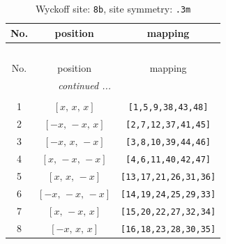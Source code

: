 \documentclass[fleqn,8pt]{jsarticle}
\begin{document}
\renewcommand{\arraystretch}{1.2}
\begin{longtable}{ccc}
\caption{Wyckoff site: {\tt 8b}, site symmetry: {\tt .3m}}
 \\
 \hline \hline
No. & position & mapping \\ \hline \endfirsthead

\multicolumn{2}{l}{\tablename\ \thetable{}} \\
 \hline \hline
No. & position & mapping \\ \hline \endhead

 \hline \hline
\multicolumn{2}{r}{\footnotesize\it continued ...} \\ \endfoot

 \hline \hline
\multicolumn{2}{r}{} \\ \endlastfoot

1 & $\left[ x,\, x,\, x \right]$ & {\tt [1,5,9,38,43,48]} \\ \hline
2 & $\left[ - x,\, - x,\, x \right]$ & {\tt [2,7,12,37,41,45]} \\ \hline
3 & $\left[ - x,\, x,\, - x \right]$ & {\tt [3,8,10,39,44,46]} \\ \hline
4 & $\left[ x,\, - x,\, - x \right]$ & {\tt [4,6,11,40,42,47]} \\ \hline
5 & $\left[ x,\, x,\, - x \right]$ & {\tt [13,17,21,26,31,36]} \\ \hline
6 & $\left[ - x,\, - x,\, - x \right]$ & {\tt [14,19,24,25,29,33]} \\ \hline
7 & $\left[ x,\, - x,\, x \right]$ & {\tt [15,20,22,27,32,34]} \\ \hline
8 & $\left[ - x,\, x,\, x \right]$ & {\tt [16,18,23,28,30,35]} \\
\end{longtable}
\renewcommand{\arraystretch}{1.2}
\end{document}
